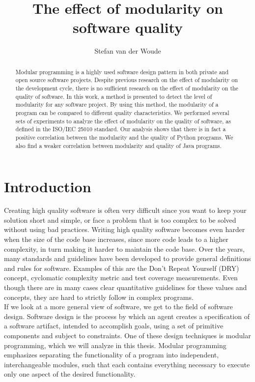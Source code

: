 \documentclass[twoside]{uva-inf-bachelor-thesis}
\title{The effect of modularity on software quality}
\author{Stefan van der Woude}
\begin{document}
\maketitle

\begin{abstract}
Modular programming is a highly used software design pattern in both private and open source software projects. Despite previous research on the effect of modularity on the development cycle, there is no sufficient research  on the effect of modularity on the quality of software. In this work, a method  is presented to detect the level of modularity for any software project. By using this method, the modularity of a program can be compared to different  quality characteristics. We performed several sets of experiments to analyze the effect of modularity on the quality of software, as defined in the ISO/IEC 25010 standard. Our analysis shows that there is in fact a positive correlation between the modularity and the quality of Python programs. We also find a weaker correlation between modularity and quality of Java programs.
\end{abstract}

\tableofcontents


\chapter{Introduction}
Creating high quality software is often very difficult since you want to keep your solution short and simple, or face a problem that is too complex to be solved without using bad practices. Writing high quality software becomes even harder when the size of the code base increases, since more code leads to a higher complexity\cite{bhatia2014survey}, in turn making it harder to maintain the code base\cite{banker1993software}. Over the years, many standards and guidelines have been developed to provide general definitions and rules for software. Examples of this are the Don't Repeat Yourself (DRY) concept\cite{hunt2000pragmatic}, cyclomatic complexity metric\cite{mccabe1976complexity} and test coverage measurements\cite{miller1963systematic}. Even though there are in many cases clear quantitative guidelines for these values and concepts, they are hard to strictly follow in complex programs.\\

If we look at a more general view of software, we get to the field of software design. Software design is the process by which an agent creates a specification of a software artifact, intended to accomplish goals, using a set of primitive components and subject to constraints\cite{ralph2009proposal}. One of these design techniques is modular programming\cite{barnett1968modular}, which we will analyze in this thesis. Modular programming emphasizes separating the functionality of a program into independent, interchangeable modules, such that each contains everything necessary to execute only one aspect of the desired functionality.
\end{document}
